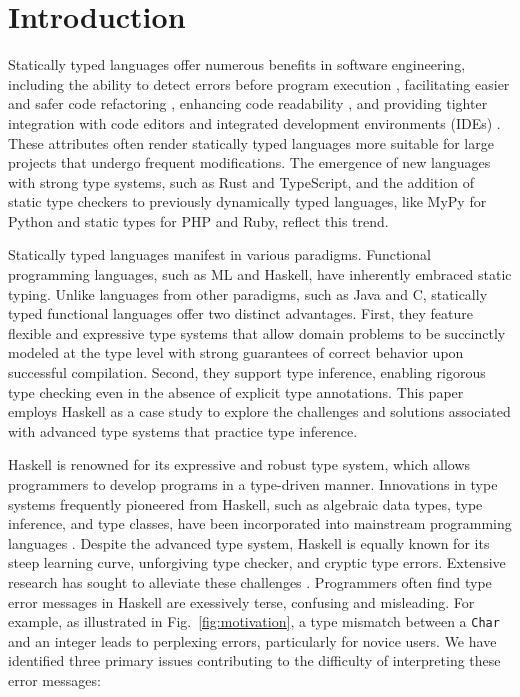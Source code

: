 \documentclass[pdflatex,sn-mathphys-num]{sn-jnl}%
\begin{document}
\section{Introduction} \label{sec:introduction}

Statically typed languages offer numerous benefits in software engineering, including the ability to detect errors before program execution \cite{Ray2017-gq,Gao2017-xn}, facilitating easier and safer code refactoring \cite{Kleinschmager2012-bg}, enhancing code readability \cite{Endrikat2014-uz}, and providing tighter integration with code editors and integrated development environments (IDEs) \cite{Mayer2012-ko}. These attributes often render statically typed languages more suitable for large projects that undergo frequent modifications. The emergence of new languages with strong type systems, such as Rust and TypeScript, and the addition of static type checkers to previously dynamically typed languages, like MyPy for Python and static types for PHP and Ruby, reflect this trend.

Statically typed languages manifest in various paradigms. Functional programming languages, such as ML and Haskell, have inherently embraced static typing. Unlike languages from other paradigms, such as Java and C, statically typed functional languages offer two distinct advantages. First, they feature flexible and expressive type systems that allow domain problems to be succinctly modeled at the type level with strong guarantees of correct behavior upon successful compilation. Second, they support type inference, enabling rigorous type checking even in the absence of explicit type annotations. This paper employs Haskell as a case study to explore the challenges and solutions associated with advanced type systems that practice type inference.

Haskell is renowned for its expressive and robust type system, which allows programmers to develop programs in a type-driven manner. Innovations in type systems frequently pioneered from Haskell, such as algebraic data types, type inference, and type classes, have been incorporated into mainstream programming languages \cite{Hudak2007-kn, TypeScriptTeam_undated-qk, Klabnik_undated-mp, Griesemer_undated-ff}. Despite the advanced type system, Haskell is equally known for its steep learning curve, unforgiving type checker, and cryptic type errors. Extensive research has sought to alleviate these challenges \cite{Tirronen2015-nr, Chen2014-dz, Heeren2003-kd, Zhang2015-xy, Lerner2007-mu, Zhang2017-tj}. Programmers often find type error messages in Haskell are exessively terse, confusing and misleading. For example, as illustrated in Fig.~\ref{fig:motivation}, a type mismatch between a {\tt Char} and an integer leads to perplexing errors, particularly for novice users. We have identified three primary issues contributing to the difficulty of interpreting these error messages:
\end{document}
